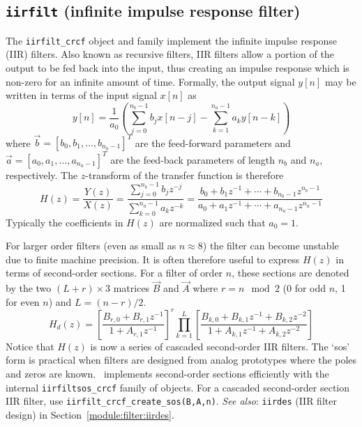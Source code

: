 % 
%
\subsection{{\tt iirfilt} (infinite impulse response filter)}
\label{module:filter:iirfilt}
The {\tt iirfilt\_crcf} object and family implement the infinite impulse
response (IIR) filters.
Also known as recursive filters, IIR filters allow a portion of the output to
be fed back into the input, thus creating an impulse response which is
non-zero for an infinite amount of time.
Formally, the output signal $y[n]$ may be written in terms of the input signal
$x[n]$ as
%
\begin{equation}
\label{eqn:filter:iirfilt:y}
    y[n] = \frac{1}{a_0} \left(
           \sum_{j=0}^{n_b-1}{ b_j x[n-j] } -
           \sum_{k=1}^{n_a-1}{ a_k y[n-k] }
           \right)
\end{equation}
%
where $\vec{b} = [b_0,b_1,\ldots,b_{n_b-1}]^T$ are the feed-forward parameters
and   $\vec{a} = [a_0,a_1,\ldots,a_{n_a-1}]^T$ are the feed-back parameters
of length $n_b$ and $n_a$, respectively.
The $z$-transform of the transfer function is therefore
%
\begin{equation}
\label{eqn:filter:iirfilt:Hz}
    H(z) = \frac{Y(z)}{X(z)}
         = \frac{\sum\limits_{j=0}^{n_b-1}{b_j z^{-j}}}
                {\sum\limits_{k=0}^{n_a-1}{a_k z^{-k}}}
         = \frac{ b_0 + b_1 z^{-1} + \cdots + b_{n_b-1} z^{n_b-1}}
                { a_0 + a_1 z^{-1} + \cdots + a_{n_a-1} z^{n_a-1}}
\end{equation}
%
Typically the coefficients in $H(z)$ are normalized such that $a_0=1$.

For larger order filters (even as small as $n\approx 8$) the filter can become
unstable due to finite machine precision.
It is often therefore useful to express $H(z)$ in terms of second-order
sections.
For a filter of order $n$, these sections are denoted by the two
$(L+r)\times 3$ matrices $\vec{B}$ and $\vec{A}$
where $r=n \mod 2$ (0 for odd $n$, 1 for even $n$) and $L=(n-r)/2$.
%
\begin{equation}
\label{eqn:filter:iirfilt:Hdz}
    H_d(z) = 
             \left[
                \frac{B_{r,0} + B_{r,1}z^{-1}}
                     {1       + A_{r,1}z^{-1}}
             \right]^r
             \prod_{k=1}^{L} {\left[
                \frac{B_{k,0} + B_{k,1}z^{-1} + B_{k,2}z^{-2}}
                     {1       + A_{k,1}z^{-1} + A_{k,2}z^{-2}}
             \right]}
\end{equation}
%
Notice that $H(z)$ is now a series of cascaded second-order IIR filters.
The `sos' form is practical when filters are designed from analog prototypes
where the poles and zeros are known.
\liquid\ implements second-order sections efficiently with the internal
{\tt iirfiltsos\_crcf} family of objects.
For a cascaded second-order section IIR filter, use
{\tt iirfilt\_crcf\_create\_sos(B,A,n)}.
%
{\em See also}: {\tt iirdes} (IIR filter design) in
Section~\ref{module:filter:iirdes}.


